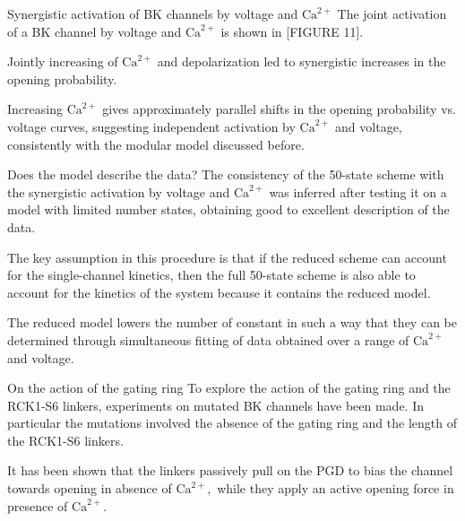 \documentclass{beamer}
\newcommand{\ca}{\text{Ca}^{2+}}
\begin{document}
\begin{frame}{Synergistic activation of BK channels by voltage and $\ca$}
The joint activation of a BK channel by voltage and $\ca$ is shown in [FIGURE 11].

Jointly increasing of $\ca$ and depolarization led to synergistic increases in the opening probability.

Increasing $\ca$ gives approximately parallel shifts in the opening probability vs. voltage curves, suggesting independent activation by $\ca$ and voltage, consistently with the modular model discussed before.
\end{frame}

\begin{frame}{Does the model describe the data?}
The consistency of the 50-state scheme with the synergistic activation by voltage and $\ca$ was inferred after testing it on a model with limited number states, obtaining good to excellent description of the data.

The key assumption in this procedure is that if the reduced scheme can account for the single-channel kinetics, then the full 50-state scheme is also able to account for the kinetics of the system because it contains the reduced model.

The reduced model lowers the number of constant in such a way that they can be determined through simultaneous fitting of data obtained over a range of $\ca$ and voltage.
\end{frame}

\begin{frame}{On the action of the gating ring}
To explore the action of the gating ring and the RCK1-S6 linkers, experiments on mutated BK channels have been made.
In particular the mutations involved the absence of the gating ring and the length of the RCK1-S6 linkers.

It has been shown that the linkers passively pull on the PGD to bias the channel towards opening in absence of $\ca,$ while they apply an active opening force in  presence of $\ca.$
\end{frame}
\end{document}
